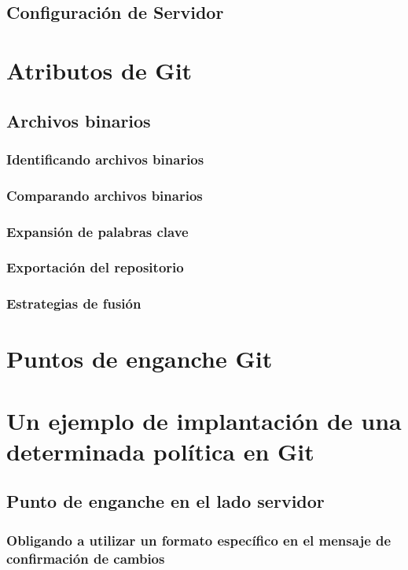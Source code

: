 \documentclass[12pt, spanish, oneside, onecolumn, a4paper]{report}
\begin{document}
\subsection{Configuración de Servidor} 
\label{sec:serverconf} 
\section{Atributos de Git} 
\label{sec:attributesgit} 
\subsection{Archivos binarios} 
\label{sec:binaryfiles} 
\subsubsection{Identificando archivos binarios} 
\label{sec:identifyingbinary} 
\subsubsection{Comparando archivos binarios} 
\label{sec:comparingbinaries}

\subsubsection{Expansión de palabras clave} 
\label{sec:expandingkeywords} 
\subsubsection{Exportación del repositorio} 
\label{sec:exportgit} 
\subsubsection{Estrategias de fusión} 
\label{sec:mergestrategies} 
\section{Puntos de enganche Git} 
\label{sec:hooks} 
\section{Un ejemplo de implantación de una determinada política en Git} 
\label{sec:policy} 
\subsection{Punto de enganche en el lado servidor} 
\label{sec:serverhook} 
\subsubsection{Obligando a utilizar un formato específico en el mensaje de confirmación de cambios} 
\label{sec:mandatorycommitmessage} 
\end{document}
